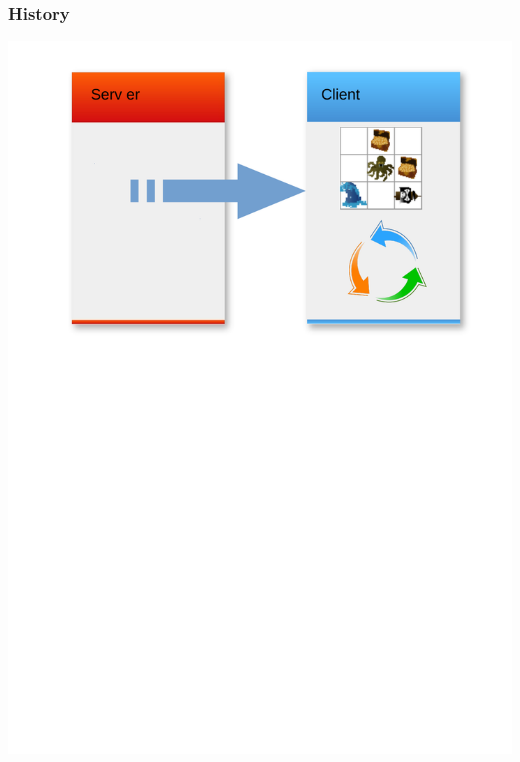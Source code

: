 

\begin{frame}
	\frametitle{History}
	\begin{center}
		\includegraphics[scale=0.5]{simulation/history1.pdf}
	\end{center}
\end{frame}

